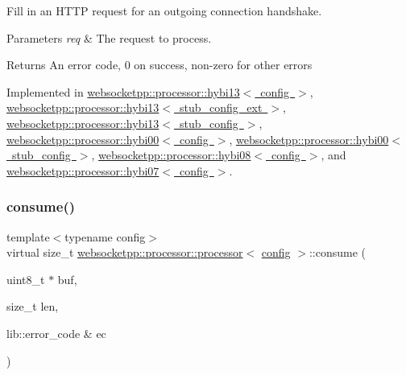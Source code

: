 Fill in an H\+T\+TP request for an outgoing connection handshake. 


\begin{DoxyParams}{Parameters}
{\em req} & The request to process.\\
\hline
\end{DoxyParams}
\begin{DoxyReturn}{Returns}
An error code, 0 on success, non-\/zero for other errors 
\end{DoxyReturn}


Implemented in \mbox{\hyperlink{classwebsocketpp_1_1processor_1_1hybi13_a587360571f5bb11b7d0c39b69566bf38}{websocketpp\+::processor\+::hybi13$<$ config $>$}}, \mbox{\hyperlink{classwebsocketpp_1_1processor_1_1hybi13_a587360571f5bb11b7d0c39b69566bf38}{websocketpp\+::processor\+::hybi13$<$ stub\+\_\+config\+\_\+ext $>$}}, \mbox{\hyperlink{classwebsocketpp_1_1processor_1_1hybi13_a587360571f5bb11b7d0c39b69566bf38}{websocketpp\+::processor\+::hybi13$<$ stub\+\_\+config $>$}}, \mbox{\hyperlink{classwebsocketpp_1_1processor_1_1hybi00_a5f88e94fc52da9be8ba718889b5c093f}{websocketpp\+::processor\+::hybi00$<$ config $>$}}, \mbox{\hyperlink{classwebsocketpp_1_1processor_1_1hybi00_a5f88e94fc52da9be8ba718889b5c093f}{websocketpp\+::processor\+::hybi00$<$ stub\+\_\+config $>$}}, \mbox{\hyperlink{classwebsocketpp_1_1processor_1_1hybi08_a9509cba08ab3a15ea2ff34276b2582cb}{websocketpp\+::processor\+::hybi08$<$ config $>$}}, and \mbox{\hyperlink{classwebsocketpp_1_1processor_1_1hybi07_a9742c622a7b1b5d54daa03a2fe0b060b}{websocketpp\+::processor\+::hybi07$<$ config $>$}}.

\mbox{\label{classwebsocketpp_1_1processor_1_1processor_a14cb7ee9cd5fa60353ba198f1d3d06c5}} 
\subsubsection{\texorpdfstring{consume()}{consume()}}
{\footnotesize\ttfamily template$<$typename config$>$ \\
virtual size\+\_\+t \mbox{\hyperlink{classwebsocketpp_1_1processor_1_1processor}{websocketpp\+::processor\+::processor}}$<$ \mbox{\hyperlink{classconfig}{config}} $>$\+::consume (\begin{DoxyParamCaption}\item[{uint8\+\_\+t $\ast$}]{buf,  }\item[{size\+\_\+t}]{len,  }\item[{lib\+::error\+\_\+code \&}]{ec }\end{DoxyParamCaption})\hspace{0.3cm}{\ttfamily [pure virtual]}}



